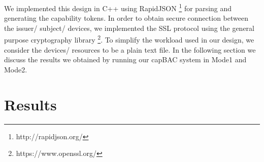 We implemented this design in C++ using RapidJSON \footnote{http://rapidjson.org/} for parsing and generating the capability tokens. In order to obtain secure connection between the issuer/ subject/ devices, we implemented the SSL protocol using the general purpose cryptography library \footnote{https://www.openssl.org/}. To simplify the workload used in our design, we consider the devices/ resources to be a plain text file. In the following section we discuss the results we obtained by running our capBAC system in Mode1 and Mode2. 

\section{Results}
\label{sec:results}
